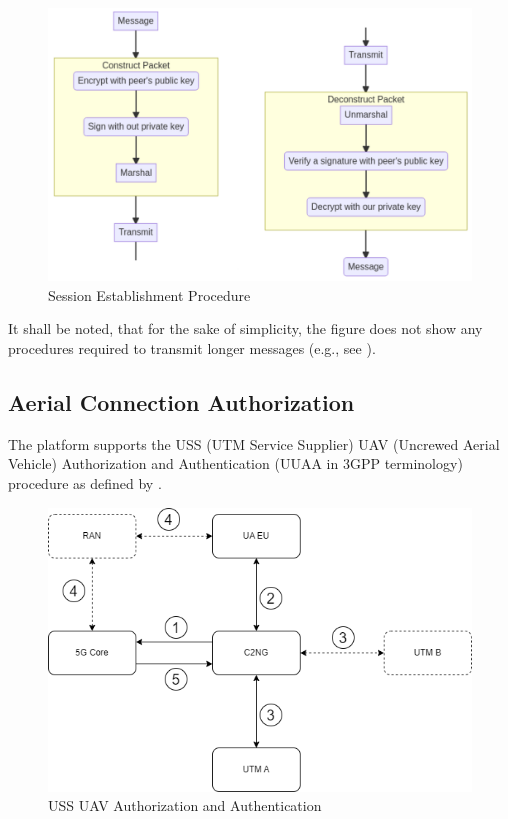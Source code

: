 \documentclass[a4paper,conference]{IEEEtran}
\begin{document}
\begin{figure}[!ht]
\centering
\includegraphics[width=0.9\linewidth]{images/exchange.png}
\caption{Session Establishment Procedure}\label{fig:exchange}
\end{figure}

It shall be noted, that for the sake of simplicity, the figure does not show any procedures required to transmit longer messages (e.g., see \cite{cryptoeprint:2000/065}). 

\subsection{Aerial Connection Authorization}

The platform supports the USS (UTM Service Supplier) UAV (Uncrewed Aerial Vehicle) Authorization and Authentication (UUAA in 3GPP terminology) procedure as defined by \cite{3gpp:uuaa}. 

\begin{figure}[!ht]
\centering
\includegraphics[width=0.9\linewidth]{images/uuaa.png}
\caption{USS UAV Authorization and Authentication}\label{fig:uuaa}
\end{figure}
\end{document}
